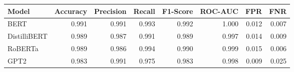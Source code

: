 \begin{tabular}{|l||r|r|r|r|r|r|r|}
\toprule
Model & \textbf{Accuracy} & \textbf{Precision} & Recall & \textbf{F1-Score} & \textbf{ROC-AUC} & \textbf{FPR} & FNR \\
\midrule \midrule
BERT & 0.991 & 0.991 & 0.993 & 0.992 & 1.000 & 0.012 & 0.007 \\
DistilliBERT & 0.989 & 0.987 & 0.991 & 0.989 & 0.997 & 0.014 & 0.009 \\
RoBERTa & 0.989 & 0.986 & 0.994 & 0.990 & 0.999 & 0.015 & 0.006 \\
GPT2 & 0.983 & 0.991 & 0.975 & 0.983 & 0.998 & 0.009 & 0.025 \\
\bottomrule
\end{tabular}
